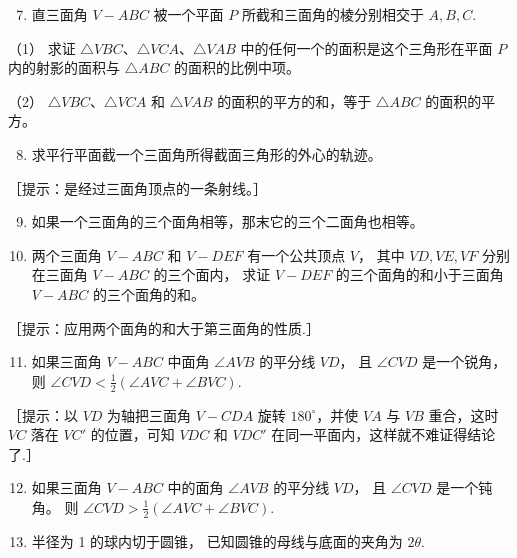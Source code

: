 \begin{enumerate}
\setcounter{enumi}{6}
\item
  直三面角 \(V - ABC\) 被一个平面 \(P\) 所截和三面角的棱分别相交于
  \(A, B, C\).
\end{enumerate}

（1） 求证 \(\triangle VBC\)、\(\triangle VCA\)、\(\triangle VAB\)
中的任何一个的面积是这个三角形在平面 \(P\) 内的射影的面积与
\(\triangle ABC\) 的面积的比例中项。

（2） \(\triangle VBC\)、\(\triangle VCA\) 和 \(\triangle VAB\)
的面积的平方的和，等于 \(\triangle ABC\) 的面积的平方。

\begin{enumerate}
\setcounter{enumi}{7}
\item
  求平行平面截一个三面角所得截面三角形的外心的轨迹。
\end{enumerate}

［提示：是经过三面角顶点的一条射线。］

\begin{enumerate}
\setcounter{enumi}{8}
\item
  如果一个三面角的三个面角相等，那末它的三个二面角也相等。
\item
  两个三面角 \(V - ABC\) 和 \(V - DEF\) 有一个公共顶点 \(V\)， 其中
  \(VD, VE, VF\) 分别在三面角 \(V - ABC\) 的三个面内， 求证 \(V - DEF\)
  的三个面角的和小于三面角 \(V - ABC\) 的三个面角的和。
\end{enumerate}

［提示：应用两个面角的和大于第三面角的性质.］

\begin{enumerate}
\setcounter{enumi}{10}
\item
  如果三面角 \(V - ABC\) 中面角 \(\angle AVB\) 的平分线 \(VD\)， 且
  \(\angle CVD\) 是一个锐角， 则
  \(\angle CVD < \frac{1}{2} (\angle AVC + \angle BVC)\).
\end{enumerate}

［提示：以 \(VD\) 为轴把三面角 \(V - CDA\) 旋转 \(180^{\circ}\)，并使
\(VA\) 与 \(VB\) 重合，这时 \(VC\) 落在 \(VC'\) 的位置，可知 \(VDC\) 和
\(VDC'\) 在同一平面内，这样就不难证得结论了.］

\begin{enumerate}
\setcounter{enumi}{11}
\item
  如果三面角 \(V - ABC\) 中的面角 \(\angle AVB\) 的平分线 \(VD\)， 且
  \(\angle CVD\) 是一个钝角。 则
  \(\angle CVD > \frac{1}{2} (\angle AVC + \angle BVC)\).
\item
  半径为 1 的球内切于圆锥， 已知圆锥的母线与底面的夹角为 \(2\theta\).
\end{enumerate}

